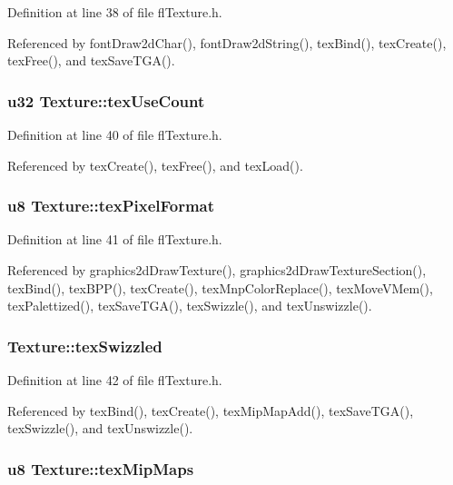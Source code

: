 Definition at line 38 of file fl\-Texture.h.

Referenced by font\-Draw2d\-Char(), font\-Draw2d\-String(), tex\-Bind(), tex\-Create(), tex\-Free(), and tex\-Save\-TGA().
\subsubsection{\setlength{\rightskip}{0pt plus 5cm}u32 {\bf Texture::tex\-Use\-Count}}\label{structTexture_b4e258d8ac5eea84e02eeef676b50367}




Definition at line 40 of file fl\-Texture.h.

Referenced by tex\-Create(), tex\-Free(), and tex\-Load().
\subsubsection{\setlength{\rightskip}{0pt plus 5cm}u8 {\bf Texture::tex\-Pixel\-Format}}\label{structTexture_ef91e63f1b683d8d2b8243b75b490494}




Definition at line 41 of file fl\-Texture.h.

Referenced by graphics2d\-Draw\-Texture(), graphics2d\-Draw\-Texture\-Section(), tex\-Bind(), tex\-BPP(), tex\-Create(), tex\-Mnp\-Color\-Replace(), tex\-Move\-VMem(), tex\-Palettized(), tex\-Save\-TGA(), tex\-Swizzle(), and tex\-Unswizzle().
\subsubsection{ {\bf Texture::tex\-Swizzled}}\label{structTexture_38a406d2ade728542da2027fec63e334}




Definition at line 42 of file fl\-Texture.h.

Referenced by tex\-Bind(), tex\-Create(), tex\-Mip\-Map\-Add(), tex\-Save\-TGA(), tex\-Swizzle(), and tex\-Unswizzle().
\subsubsection{\setlength{\rightskip}{0pt plus 5cm}u8 {\bf Texture::tex\-Mip\-Maps}}\label{structTexture_dde8d456bf4f3557fead4c1d20f7adcf}




